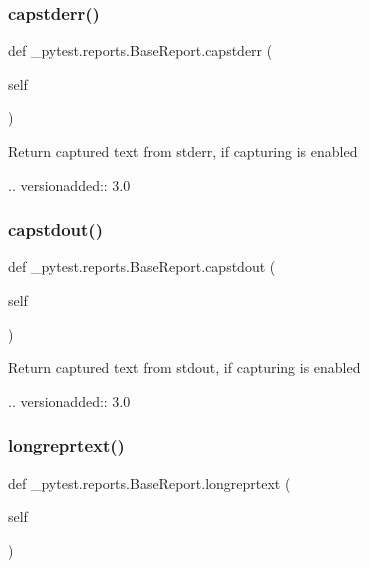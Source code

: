 \subsubsection{\texorpdfstring{capstderr()}{capstderr()}}
{\footnotesize\ttfamily def \+\_\+pytest.\+reports.\+Base\+Report.\+capstderr (\begin{DoxyParamCaption}\item[{}]{self }\end{DoxyParamCaption})}

\begin{DoxyVerb}Return captured text from stderr, if capturing is enabled

.. versionadded:: 3.0
\end{DoxyVerb}
 \mbox{\label{class__pytest_1_1reports_1_1_base_report_a10da4e85e2bc5d828d92fa11160273a1}} 
\subsubsection{\texorpdfstring{capstdout()}{capstdout()}}
{\footnotesize\ttfamily def \+\_\+pytest.\+reports.\+Base\+Report.\+capstdout (\begin{DoxyParamCaption}\item[{}]{self }\end{DoxyParamCaption})}

\begin{DoxyVerb}Return captured text from stdout, if capturing is enabled

.. versionadded:: 3.0
\end{DoxyVerb}
 \mbox{\label{class__pytest_1_1reports_1_1_base_report_ab2a286761e9256f3204d1246bfe43866}} 
\subsubsection{\texorpdfstring{longreprtext()}{longreprtext()}}
{\footnotesize\ttfamily def \+\_\+pytest.\+reports.\+Base\+Report.\+longreprtext (\begin{DoxyParamCaption}\item[{}]{self }\end{DoxyParamCaption})}

